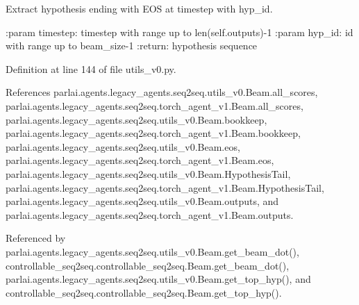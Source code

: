 \begin{DoxyVerb}Extract hypothesis ending with EOS at timestep with hyp_id.

:param timestep: timestep with range up to len(self.outputs)-1
:param hyp_id: id with range up to beam_size-1
:return: hypothesis sequence
\end{DoxyVerb}
 

Definition at line 144 of file utils\+\_\+v0.\+py.



References parlai.\+agents.\+legacy\+\_\+agents.\+seq2seq.\+utils\+\_\+v0.\+Beam.\+all\+\_\+scores, parlai.\+agents.\+legacy\+\_\+agents.\+seq2seq.\+torch\+\_\+agent\+\_\+v1.\+Beam.\+all\+\_\+scores, parlai.\+agents.\+legacy\+\_\+agents.\+seq2seq.\+utils\+\_\+v0.\+Beam.\+bookkeep, parlai.\+agents.\+legacy\+\_\+agents.\+seq2seq.\+torch\+\_\+agent\+\_\+v1.\+Beam.\+bookkeep, parlai.\+agents.\+legacy\+\_\+agents.\+seq2seq.\+utils\+\_\+v0.\+Beam.\+eos, parlai.\+agents.\+legacy\+\_\+agents.\+seq2seq.\+torch\+\_\+agent\+\_\+v1.\+Beam.\+eos, parlai.\+agents.\+legacy\+\_\+agents.\+seq2seq.\+utils\+\_\+v0.\+Beam.\+Hypothesis\+Tail, parlai.\+agents.\+legacy\+\_\+agents.\+seq2seq.\+torch\+\_\+agent\+\_\+v1.\+Beam.\+Hypothesis\+Tail, parlai.\+agents.\+legacy\+\_\+agents.\+seq2seq.\+utils\+\_\+v0.\+Beam.\+outputs, and parlai.\+agents.\+legacy\+\_\+agents.\+seq2seq.\+torch\+\_\+agent\+\_\+v1.\+Beam.\+outputs.



Referenced by parlai.\+agents.\+legacy\+\_\+agents.\+seq2seq.\+utils\+\_\+v0.\+Beam.\+get\+\_\+beam\+\_\+dot(), controllable\+\_\+seq2seq.\+controllable\+\_\+seq2seq.\+Beam.\+get\+\_\+beam\+\_\+dot(), parlai.\+agents.\+legacy\+\_\+agents.\+seq2seq.\+utils\+\_\+v0.\+Beam.\+get\+\_\+top\+\_\+hyp(), and controllable\+\_\+seq2seq.\+controllable\+\_\+seq2seq.\+Beam.\+get\+\_\+top\+\_\+hyp().

